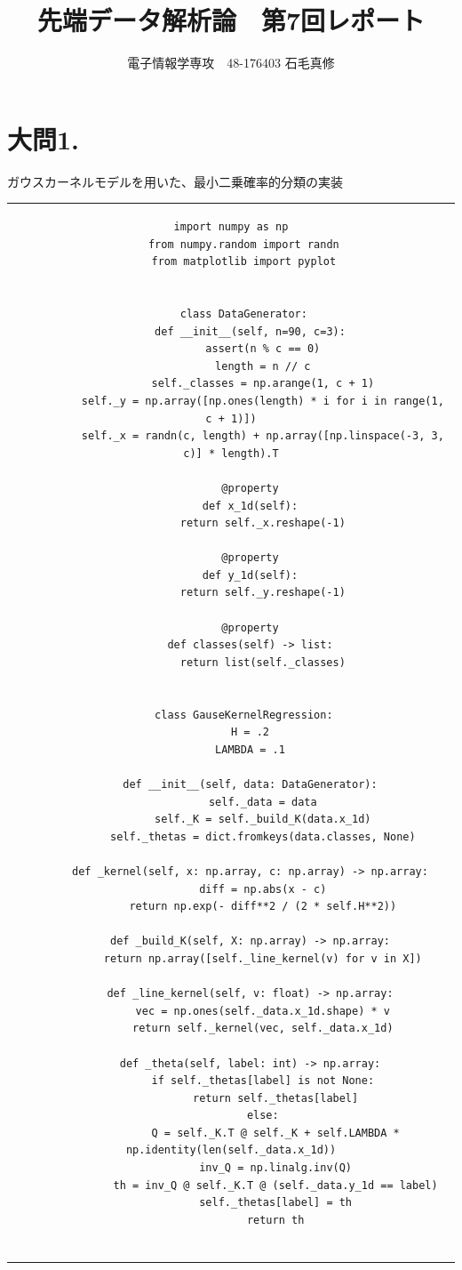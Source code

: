 \documentclass[fleqn]{jsarticle}
\begin{document}
\newcommand{\argmax}{\mathop{\rm argmax}\limits}
\newcommand{\argmin}{\mathop{\rm argmin}\limits}

\title{先端データ解析論　第7回レポート}
\author{電子情報学専攻　48-176403 石毛真修}
\maketitle


\section*{大問1.}
ガウスカーネルモデルを用いた、最小二乗確率的分類の実装
\begin{center}
\begin{tabular}{c}
  \begin{lstlisting}[]
    import numpy as np
    from numpy.random import randn
    from matplotlib import pyplot


    class DataGenerator:
      def __init__(self, n=90, c=3):
          assert(n % c == 0)
          length = n // c
          self._classes = np.arange(1, c + 1)
          self._y = np.array([np.ones(length) * i for i in range(1, c + 1)])
          self._x = randn(c, length) + np.array([np.linspace(-3, 3, c)] * length).T

      @property
      def x_1d(self):
          return self._x.reshape(-1)

      @property
      def y_1d(self):
          return self._y.reshape(-1)

      @property
      def classes(self) -> list:
          return list(self._classes)


    class GauseKernelRegression:
      H = .2
      LAMBDA = .1

      def __init__(self, data: DataGenerator):
          self._data = data
          self._K = self._build_K(data.x_1d)
          self._thetas = dict.fromkeys(data.classes, None)

      def _kernel(self, x: np.array, c: np.array) -> np.array:
          diff = np.abs(x - c)
          return np.exp(- diff**2 / (2 * self.H**2))

      def _build_K(self, X: np.array) -> np.array:
          return np.array([self._line_kernel(v) for v in X])

      def _line_kernel(self, v: float) -> np.array:
          vec = np.ones(self._data.x_1d.shape) * v
          return self._kernel(vec, self._data.x_1d)

      def _theta(self, label: int) -> np.array:
          if self._thetas[label] is not None:
              return self._thetas[label]
          else:
              Q = self._K.T @ self._K + self.LAMBDA * np.identity(len(self._data.x_1d))
              inv_Q = np.linalg.inv(Q)
              th = inv_Q @ self._K.T @ (self._data.y_1d == label)
              self._thetas[label] = th
              return th


\end{lstlisting}
\end{tabular}
\end{center}
\end{document}
